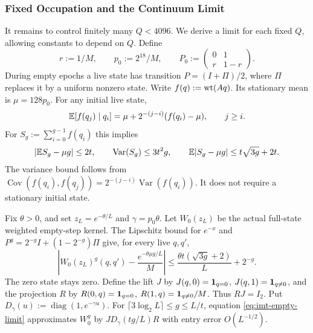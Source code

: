\subsubsection{Fixed Occupation and the Continuum Limit}
\label{app:imt-fixed}

It remains to control finitely many $Q<4096$. We derive a limit for each
fixed $Q$, allowing constants to depend on $Q$. Define
\[
 r:=1/M,\qquad p_0:=2^{18}/M,\qquad
 P_0:=\begin{pmatrix}0&1\\r&1-r\end{pmatrix}.
\]
During empty epochs a live state has transition $P=(I+\Pi)/2$, where
$\Pi$ replaces it by a uniform nonzero state. Write $f(q):=\operatorname{wt}(Aq)$.
Its stationary mean is $\mu=128p_0$. For any initial live state,
\[
 \mathbb E[f(q_j)\mid q_i]=\mu+2^{-(j-i)}(f(q_i)-\mu),\qquad j\ge i.
\]
For $S_g:=\sum_{i=0}^{g-1}f(q_i)$ this implies
\[
 |\mathbb E S_g-\mu g|\le2t,\qquad
 \operatorname{Var}(S_g)\le3t^2g,\qquad
 \mathbb E|S_g-\mu g|\le t\sqrt{3g}+2t.
\]
The variance bound follows from
$\operatorname{Cov}(f(q_i),f(q_j))=2^{-(j-i)}\operatorname{Var}(f(q_i))$.
It does not require a stationary initial state.

Fix $\theta>0$, and set $z_L=e^{-\theta/L}$ and $\gamma=p_0\theta$.
Let $W_0(z_L)$ be the actual full-state weighted empty-step kernel.
The Lipschitz bound for $e^{-x}$ and
$P^g=2^{-g}I+(1-2^{-g})\Pi$ give, for every live $q,q'$,
\begin{equation}
 \left|W_0(z_L)^g(q,q')-\frac{e^{-\theta\mu g/L}}M\right|
 \le\frac{\theta t(\sqrt{3g}+2)}L+2^{-g}.
 \label{eq:imt-empty-limit}
\end{equation}
The zero state stays zero. Define the lift $J$ by $J(q,0)=\mathbf 1_{q=0}$,
$J(q,1)=\mathbf 1_{q\ne0}$, and the projection $R$ by
$R(0,q)=\mathbf 1_{q=0}$, $R(1,q)=\mathbf 1_{q\ne0}/M$. Thus $RJ=I_2$.
Put $D_\gamma(u):=\operatorname{diag}(1,e^{-\gamma u})$.
For $\lceil3\log_2L\rceil\le g\le L/t$, equation
\eqref{eq:imt-empty-limit} approximates $W_0^g$ by
$JD_\gamma(tg/L)R$ with entry error $O(L^{-1/2})$.

